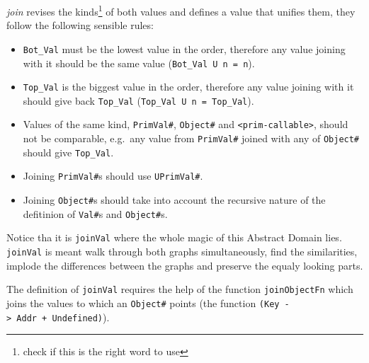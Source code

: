 \emph{join} revises the kinds\footnote{check if this is the right word
  to use} of both values and defines a value that unifies them, they
follow the following sensible rules:

\begin{itemize}
\tightlist
\item
  \texttt{Bot\_Val} must be the lowest value in the order, therefore any
  value joining with it should be the same value
  (\texttt{Bot\_Val\ U\ n\ =\ n}).
\item
  \texttt{Top\_Val} is the biggest value in the order, therefore any
  value joining with it should give back \texttt{Top\_Val}
  (\texttt{Top\_Val\ U\ n\ =\ Top\_Val}).
\item
  Values of the same kind, \texttt{PrimVal\#}, \texttt{Object\#} and
  \texttt{\textless{}prim-callable\textgreater{}}, should not be
  comparable, e.g.~any value from \texttt{PrimVal\#} joined with any of
  \texttt{Object\#} should give \texttt{Top\_Val}.
\item
  Joining \texttt{PrimVal\#}s should use \texttt{UPrimVal\#}.
\item
  Joining \texttt{Object\#}s should take into account the recursive
  nature of the defitinion of \texttt{Val\#}s and \texttt{Object\#}s.
\end{itemize}

Notice tha it is \texttt{joinVal} where the whole magic of this Abstract
Domain lies. \texttt{joinVal} is meant walk through both graphs
simultaneously, find the similarities, implode the differences between
the graphs and preserve the equaly looking parts.

The definition of \texttt{joinVal} requires the help of the function
\texttt{joinObjectFn} which joins the values to which an
\texttt{Object\#} points (the function
\texttt{(Key\ -\textgreater{}\ Addr\ +\ Undefined)}).

